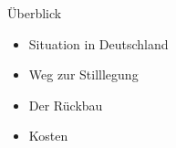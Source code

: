 


\frame{\maketitle}




\begin{frame}{ Überblick }
  \begin{itemize}
    \setlength\itemsep{1.2em}
      \item{ Situation in Deutschland }
      \item{ Weg zur Stilllegung}
      \item{ Der Rückbau }
      \item{ Kosten }
  \end{itemize}
\end{frame}






